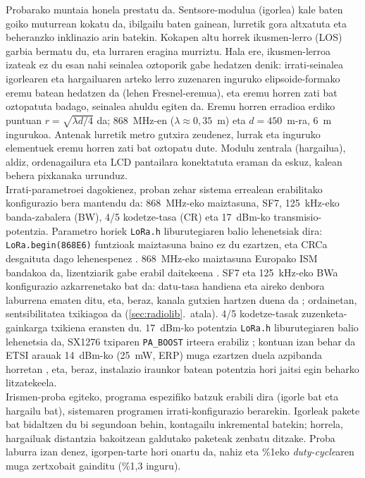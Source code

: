 \documentclass[10pt]{article}
\newcommand{\acpar}[1]{(\acs{#1})\acused{#1}}
\begin{document}
Probarako muntaia honela prestatu da. Sentsore-modulua (igorlea) kale baten goiko muturrean kokatu da, ibilgailu baten gainean, lurretik gora altxatuta eta beheranzko inklinazio arin batekin. Kokapen altu horrek ikusmen-lerro \acpar{LOS} garbia bermatu du, eta lurraren eragina murriztu. Hala ere, ikusmen-lerroa izateak ez du esan nahi seinalea oztoporik gabe hedatzen denik: irrati-seinalea igorlearen eta hargailuaren arteko lerro zuzenaren inguruko elipsoide-formako eremu batean hedatzen da (lehen Fresnel-eremua), eta eremu horren zati bat oztopatuta badago, seinalea ahuldu egiten da. Eremu horren erradioa erdiko puntuan $r=\sqrt{\lambda d/4}$ da; 868~MHz-en ($\lambda\approx0{,}35$~m) eta $d=450$~m-ra, 6~m ingurukoa. Antenak lurretik metro gutxira zeudenez, lurrak eta inguruko elementuek eremu horren zati bat oztopatu dute. Modulu zentrala (hargailua), aldiz, ordenagailura eta \ac{LCD} pantailara konektatuta eraman da eskuz, kalean behera pixkanaka urrunduz.\\

Irrati-parametroei dagokienez, proban zehar sistema errealean erabilitako konfigurazio bera mantendu da: 868~MHz-eko maiztasuna, SF7, 125~kHz-eko banda-zabalera \acpar{BW}, 4/5 kodetze-tasa \acpar{CR} eta 17~dBm-ko transmisio-potentzia. Parametro horiek \texttt{LoRa.h} liburutegiaren balio lehenetsiak dira: \texttt{LoRa.begin(868E6)} funtzioak maiztasuna baino ez du ezartzen, eta CRCa desgaituta dago lehenespenez \cite{arduinolora}. 868~MHz-eko maiztasuna Europako \ac{ISM} bandakoa da, lizentziarik gabe erabil daitekeena \cite{etsi300220}. SF7 eta 125~kHz-eko \ac{BW}a konfigurazio azkarrenetako bat da: datu-tasa handiena eta aireko denbora laburrena ematen ditu, eta, beraz, kanala gutxien hartzen duena da \cite{an1200_13}; ordainetan, sentsibilitatea txikiagoa da (\ref{sec:radiolib}.~atala). 4/5 kodetze-tasak zuzenketa-gainkarga txikiena eransten du. 17~dBm-ko potentzia \texttt{LoRa.h} liburutegiaren balio lehenetsia da, SX1276 txiparen \texttt{PA\_BOOST} irteera erabiliz \cite{arduinolora,sx1276datasheet}; kontuan izan behar da ETSI arauak 14~dBm-ko (25~mW, \acs{ERP}) muga ezartzen duela azpibanda horretan \cite{etsi300220}, eta, beraz, instalazio iraunkor batean potentzia hori jaitsi egin beharko litzatekeela.\\

Irismen-proba egiteko, programa espezifiko batzuk erabili dira (igorle bat eta hargailu bat), sistemaren programen irrati-konfigurazio berarekin. Igorleak pakete bat bidaltzen du bi segundoan behin, kontagailu inkremental batekin; horrela, hargailuak distantzia bakoitzean galdutako paketeak zenbatu ditzake. Proba laburra izan denez, igorpen-tarte hori onartu da, nahiz eta \%1eko \textit{duty-cycle}aren muga zertxobait gainditu (\%1,3 inguru).\\
\end{document}
